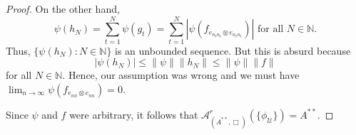 \documentclass[10pt,a4paper]{amsart}
\newcommand{\N}{\mathbb N}
\begin{document}
\begin{proof}
  On the other hand,
  \[
  \psi(h_N)=\sum_{t=1}^N\psi(g_t)=\sum_{t=1}^N|\psi(f_{
    e_{n_tn_t}\otimes e_{n_tn_t}})| \text{ for all } N \in \N.
  \]
  Thus, $\{\psi(h_N): N \in \N\}$ is an unbounded sequence. But this
  is absurd because
  \[
  |\psi(h_N)|\leq \|\psi \|\|h_N\| \leq \|\psi\| \|f\|
  \]
  for all $N \in \N$. Hence, our assumption was wrong and we must have $\lim_{n\to
    \infty}\psi(f_{ e_{nn}\otimes e_{nn}})=0$.

  Since $\psi$ and $f$ were arbitrary, it follows that
  $\mathcal{A}^r_{(A^{**},\Box)}\left(\{\phi_{\mathcal
    U}\}\right)=A^{**}.$
	\end{proof}
\end{document}
